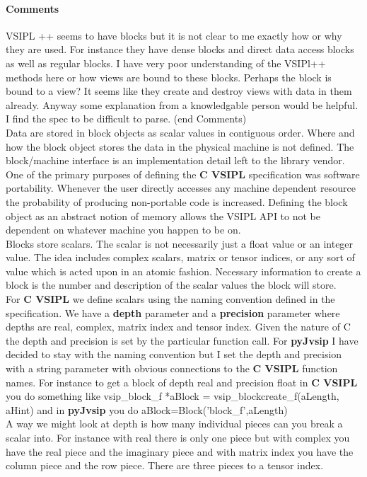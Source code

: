 \documentclass[11pt, oneside]{article}
\newcommand{\cvl}{\ttbf{C VSIPL}}
\newcommand{\pyjv}{{\ttbf{pyJvsip}}}
\newcommand{\ttbf}[1]{{\ttfamily \bfseries #1}}
\begin{document}
\paragraph{Comments} VSIPL ++ seems to have blocks but it is not clear to me exactly how or why they are used.  For instance they have dense blocks and direct data access blocks as well as regular blocks.  I have very poor understanding of the VSIPl++ methods here or how views are bound to these blocks.  Perhaps the block is bound to a view?  It seems like they create and destroy views with data in them already. Anyway some explanation from a knowledgable person would be helpful. I find the spec to be difficult to parse.   (end Comments)
\\[6pt]
Data are stored in block objects as scalar values in contiguous order. Where and how the block object stores the data in the physical machine is not defined. The block/machine interface is an implementation detail left to the library vendor.  One of the primary purposes of defining the \cvl{} specification was software portability. Whenever the user directly accesses any machine dependent resource the probability of producing non-portable code is increased. Defining the block object as an abstract notion of memory allows the VSIPL API to not be dependent on whatever machine you happen to be on.  
\\[6pt]
Blocks store scalars.  The scalar is not necessarily just a float value or an integer value.  The idea includes complex scalars, matrix or tensor indices, or any sort of value which is acted upon in an atomic fashion. Necessary information to create a block is the number and description of the scalar values the block will store.
\\[6pt]
For \cvl{} we define scalars using the naming convention defined in the specification. We have a  \ttbf{depth} parameter and a \ttbf{precision} parameter where depths are real, complex, matrix index and tensor index. Given the nature of C the depth and precision is set by the particular function call. For \pyjv{} I have decided to stay with the naming convention but I set the depth and precision with a string parameter with obvious connections to the \cvl{} function names. For instance to get a block of depth real and precision float in \cvl{} you do something like
vsip\_block\_f *aBlock = vsip\_blockcreate\_f(aLength, aHint)
and in \pyjv{} you do
aBlock=Block('block\_f',aLength)
\\[6pt]
A way we might look at depth is how many individual pieces can you break a scalar into. For instance with real there is only one piece but with complex you have the real piece and the imaginary piece and with matrix index you have the column piece and the row piece. There are three pieces to a tensor index. 
\end{document}
